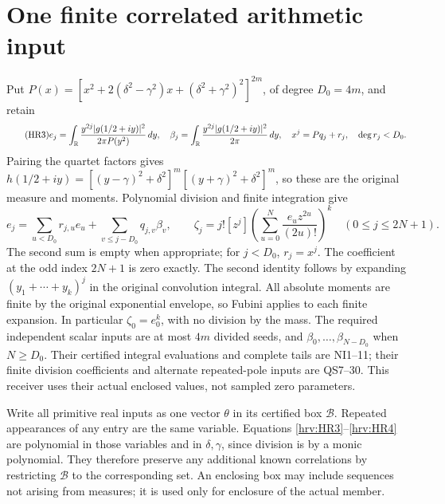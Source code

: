 \documentclass[11pt]{article}
\begin{document}
\section{One finite correlated arithmetic input}

Put \(P(x)=[x^2+2(\delta^2-\gamma^2)x+
(\delta^2+\gamma^2)^2]^{2m}\), of degree \(D_0=4m\), and retain
\begin{equation}\tag{HR3}\label{hrv:HR3}
e_j=\int_\mathbb R \frac{y^{2j}|g(1/2+iy)|^2}{2\pi P(y^2)}\,dy,
\quad \beta_j=\int_\mathbb R \frac{y^{2j}|g(1/2+iy)|^2}{2\pi}\,dy,
\quad x^j=Pq_j+r_j,\quad\deg r_j<D_0.
\end{equation}
Pairing the quartet factors gives \(h(1/2+iy)=
[(y-\gamma)^2+\delta^2]^m[(y+\gamma)^2+\delta^2]^m\), so these
are the original measure and moments. Polynomial division and finite
integration give
\begin{equation}\tag{HR4}\label{hrv:HR4}
e_j=\sum_{u<D_0}r_{j,u}e_u+\sum_{v\le j-D_0}q_{j,v}\beta_v,
\qquad
\zeta_j=j![z^j]\left(\sum_{u=0}^N\frac{e_u z^{2u}}{(2u)!}\right)^k
\quad(0\le j\le2N+1).
\end{equation}
The second sum is empty when appropriate; for \(j<D_0\), \(r_j=x^j\).
The coefficient at the odd index \(2N+1\) is zero exactly. The second
identity follows by expanding \((y_1+\cdots+y_k)^j\) in the original
convolution integral. All absolute moments are finite by the original
exponential envelope, so Fubini applies to each finite expansion.
In particular \(\zeta_0=e_0^k\), with no division by the mass.
The required independent scalar inputs are at most \(4m\) divided
seeds, and \(\beta_0,\ldots,\beta_{N-D_0}\) when \(N\ge D_0\).
Their certified integral evaluations and complete tails are NI1--11;
their finite division coefficients and alternate repeated-pole inputs
are QS7--30. This receiver uses their actual enclosed values, not
sampled zero parameters.

Write all primitive real inputs as one vector \(\theta\) in its
certified box \(\mathcal B\). Repeated appearances of any entry are
the same variable. Equations \eqref{hrv:HR3}--\eqref{hrv:HR4} are polynomial
in those variables and in \(\delta,\gamma\), since division is by a
monic polynomial. They therefore preserve any additional known
correlations by restricting \(\mathcal B\) to the corresponding set.
An enclosing box may include sequences not arising from measures;
it is used only for enclosure of the actual member.
\end{document}
